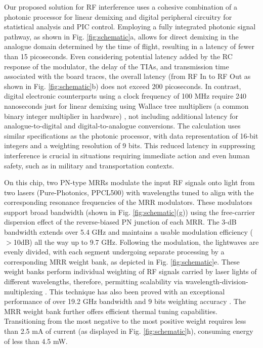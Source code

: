 \documentclass[pdflatex,mathphys]{sty}%
\begin{document}
Our proposed solution for RF interference uses a cohesive combination of a photonic processor for linear demixing and digital peripheral circuitry for statistical analysis and PIC control. Employing a fully integrated photonic signal pathway, as shown in Fig. \ref{fig:schematic}a, allows for direct demixing in the analogue domain determined by the time of flight, resulting in a latency of fewer than 15 picoseconds. Even considering potential latency added by the RC response of the modulator, the delay of the TIAs, and transmission time associated with the board traces, the overall latency (from RF In to RF Out as shown in Fig. \ref{fig:schematic}b) does not exceed 200 picoseconds. In contrast, digital electronic counterparts using a clock frequency of 100 MHz require 240 nanoseconds just for linear demixing using Wallace tree multipliers (a common binary integer multiplier in hardware) \cite{wallace1964suggestion}, not including additional latency for analogue-to-digital and digital-to-analogue conversions. The calculation uses similar specifications as the photonic processor, with data representation of 16-bit integers and a weighting resolution of 9 bits. This reduced latency in suppressing interference is crucial in situations requiring immediate action and even human safety, such as in military and transportation contexts.

On this chip, two PN-type MRRs modulate the input RF signals onto light from two lasers (Pure-Photonics, PPCL500) with wavelengths tuned to align with the corresponding resonance frequencies of the MRR modulators. These modulators support broad bandwidth (shown in Fig. \ref{fig:schematic}(g)) using the free-carrier dispersion effect of the reverse-biased PN junction of each MRR. The 3-dB bandwidth extends over 5.4 GHz and maintains a usable modulation efficiency ($>$10dB) all the way up to 9.7 GHz. Following the modulation, the lightwaves are evenly divided, with each segment undergoing separate processing by a corresponding MRR weight bank, as depicted in Fig. \ref{fig:schematic}e. These weight banks perform individual weighting of RF signals carried by laser lights of different wavelengths, therefore, permitting scalability via wavelength-division-multiplexing \cite{tait2014broadcast}. This technique has also been proved with an exceptional performance of over 19.2 GHz bandwidth \cite{zhang2022broadband} and 9 bits weighting accuracy \cite{zhang2022silicon}. The MRR weight bank further offers efficient thermal tuning capabilities. Transitioning from the most negative to the most positive weight requires less than 2.5 mA of current (as displayed in Fig. \ref{fig:schematic}h), consuming energy of less than 4.5 mW.
\end{document}
